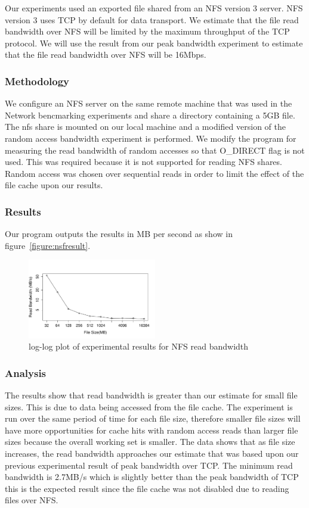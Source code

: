 Our experiments used an exported file shared from an NFS version 3 server. NFS
version 3 uses TCP by default for data transport.  We estimate that the file
read bandwidth over NFS will be limited by the maximum throughput of the TCP
protocol. We will use the result from our peak bandwidth experiment to estimate 
that the file read bandwidth over NFS will be 16Mbps.

\subsubsection{Methodology}

We configure an NFS server on the same remote machine that was used in the Network bencmarking experiments and share a directory containing a 5GB file. The nfs share is mounted on our local machine and a 
modified version of the random access bandwidth experiment is performed. We modify the program for measuring the read bandwidth of random accesses so that O\_DIRECT flag is not used. This was required because 
it is not supported for reading NFS shares. Random access was chosen over sequential reads in order to limit the effect of the file cache upon our results.

\subsubsection{Results}

Our program outputs the results in MB per second as show in figure~\ref{figure:nsfresult}.

\begin{figure}
    \centering
    \includegraphics[width=0.5\textwidth]{nfsresults.pdf}
    \caption{log-log plot of experimental results for NFS read bandwidth}
    \label{figure:nfsresult}
\end{figure}

\subsubsection{Analysis}

The results show that read bandwidth is greater than our estimate for small
file sizes. This is due to data being accessed from the file cache.  The
experiment is run over the same period of time for each file size, therefore
smaller file sizes will have more opportunities for cache hits with random
access reads than larger file sizes because the overall working set is smaller.
The data shows that as file size increases, the read bandwidth approaches our
estimate that was based upon our previous experimental result of peak bandwidth
over TCP. The minimum read bandwidth is 2.7MB/s which is slightly better than
the peak bandwidth of TCP this is the expected result since the file cache was
not disabled due to reading files over NFS.

